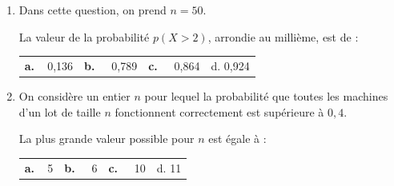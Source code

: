 \begin{enumerate}[resume]
\item Dans cette question, on prend $n =50$.

La valeur de la probabilité $p(X > 2)$, arrondie au millième, est de :
\begin{center}
\begin{tabularx}{\linewidth}{*{4}{X}}
\textbf{a.~~}0,136 &\textbf{b.~~} 0,789 &\textbf{c.~~} 0,864 &d. 0,924
\end{tabularx}
\end{center}
\item On considère un entier $n$ pour lequel la probabilité que toutes les machines d'un lot de taille $n$ fonctionnent correctement est supérieure à $0,4$.

La plus grande valeur possible pour $n$ est égale à :
\begin{center}
\begin{tabularx}{\linewidth}{*{4}{X}}
\textbf{a.~~}5 &\textbf{b.~~} 6 &\textbf{c.~~} 10 &d. 11
\end{tabularx}
\end{center}
\end{enumerate}

\bigskip
